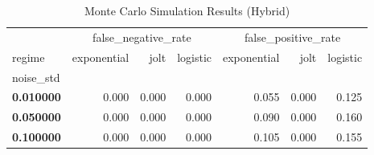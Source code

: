 \begin{table}
\caption{Monte Carlo Simulation Results (Hybrid)}
\label{tab:mc_results_hybrid}
\begin{tabular}{lrrrrrr}
\toprule
 & \multicolumn{3}{c}{false_negative_rate} & \multicolumn{3}{c}{false_positive_rate} \\
regime & exponential & jolt & logistic & exponential & jolt & logistic \\
noise_std &  &  &  &  &  &  \\
\midrule
\textbf{0.010000} & 0.000 & 0.000 & 0.000 & 0.055 & 0.000 & 0.125 \\
\textbf{0.050000} & 0.000 & 0.000 & 0.000 & 0.090 & 0.000 & 0.160 \\
\textbf{0.100000} & 0.000 & 0.000 & 0.000 & 0.105 & 0.000 & 0.155 \\
\bottomrule
\end{tabular}
\end{table}
